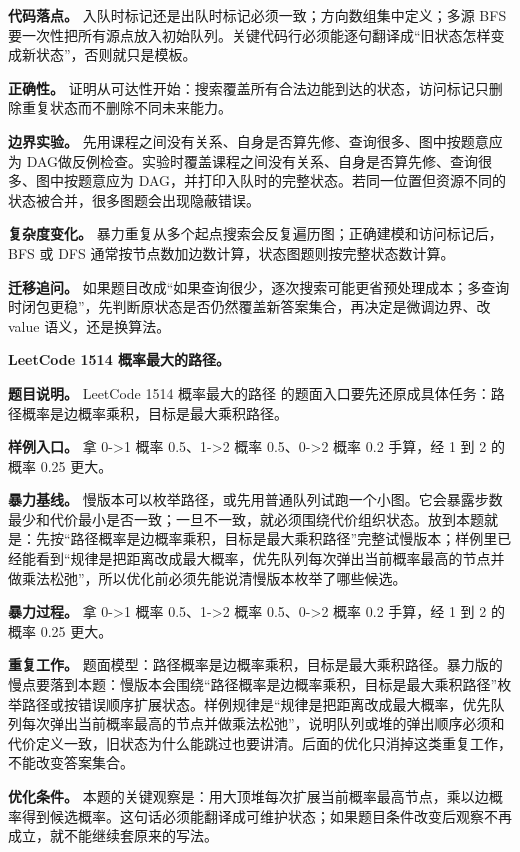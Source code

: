\textbf{代码落点。} 入队时标记还是出队时标记必须一致；方向数组集中定义；多源 BFS 要一次性把所有源点放入初始队列。关键代码行必须能逐句翻译成“旧状态怎样变成新状态”，否则就只是模板。

\textbf{正确性。} 证明从可达性开始：搜索覆盖所有合法边能到达的状态，访问标记只删除重复状态而不删除不同未来能力。

\textbf{边界实验。} 先用课程之间没有关系、自身是否算先修、查询很多、图中按题意应为 DAG做反例检查。实验时覆盖课程之间没有关系、自身是否算先修、查询很多、图中按题意应为 DAG，并打印入队时的完整状态。若同一位置但资源不同的状态被合并，很多图题会出现隐蔽错误。

\textbf{复杂度变化。} 暴力重复从多个起点搜索会反复遍历图；正确建模和访问标记后，BFS 或 DFS 通常按节点数加边数计算，状态图题则按完整状态数计算。

\textbf{迁移追问。} 如果题目改成“如果查询很少，逐次搜索可能更省预处理成本；多查询时闭包更稳”，先判断原状态是否仍然覆盖新答案集合，再决定是微调边界、改 value 语义，还是换算法。

\noindent\textbf{LeetCode 1514 概率最大的路径。}

\textbf{题目说明。} LeetCode 1514 概率最大的路径 的题面入口要先还原成具体任务：路径概率是边概率乘积，目标是最大乘积路径。

\textbf{样例入口。} 拿 0->1 概率 0.5、1->2 概率 0.5、0->2 概率 0.2 手算，经 1 到 2 的概率 0.25 更大。

\textbf{暴力基线。} 慢版本可以枚举路径，或先用普通队列试跑一个小图。它会暴露步数最少和代价最小是否一致；一旦不一致，就必须围绕代价组织状态。放到本题就是：先按“路径概率是边概率乘积，目标是最大乘积路径”完整试慢版本；样例里已经能看到“规律是把距离改成最大概率，优先队列每次弹出当前概率最高的节点并做乘法松弛”，所以优化前必须先能说清慢版本枚举了哪些候选。

\textbf{暴力过程。} 拿 0->1 概率 0.5、1->2 概率 0.5、0->2 概率 0.2 手算，经 1 到 2 的概率 0.25 更大。

\textbf{重复工作。} 题面模型：路径概率是边概率乘积，目标是最大乘积路径。暴力版的慢点要落到本题：慢版本会围绕“路径概率是边概率乘积，目标是最大乘积路径”枚举路径或按错误顺序扩展状态。样例规律是“规律是把距离改成最大概率，优先队列每次弹出当前概率最高的节点并做乘法松弛”，说明队列或堆的弹出顺序必须和代价定义一致，旧状态为什么能跳过也要讲清。后面的优化只消掉这类重复工作，不能改变答案集合。

\textbf{优化条件。} 本题的关键观察是：用大顶堆每次扩展当前概率最高节点，乘以边概率得到候选概率。这句话必须能翻译成可维护状态；如果题目条件改变后观察不再成立，就不能继续套原来的写法。

